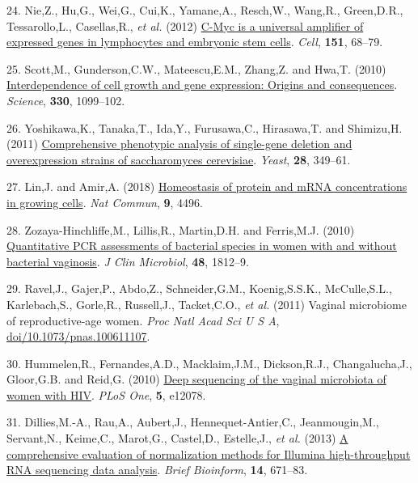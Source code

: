 \documentclass[
]{article}
\newlength{\cslhangindent}
\newenvironment{CSLReferences}[2] %
 {\begin{list}{}{%
  \setlength{\itemindent}{0pt}
  \setlength{\leftmargin}{0pt}
  \setlength{\parsep}{0pt}
  \ifodd #1
   \setlength{\leftmargin}{\cslhangindent}
   \setlength{\itemindent}{-1\cslhangindent}
  \fi
  \setlength{\itemsep}{#2\baselineskip}}}
 {\end{list}}
\begin{document}
\begin{CSLReferences}{1}{1}
24. Nie,Z., Hu,G., Wei,G., Cui,K., Yamane,A., Resch,W., Wang,R.,
Green,D.R., Tessarollo,L., Casellas,R., \emph{et al.} (2012)
\href{https://doi.org/10.1016/j.cell.2012.08.033}{C-{M}yc is a universal
amplifier of expressed genes in lymphocytes and embryonic stem cells}.
\emph{Cell}, \textbf{151}, 68--79.

25. Scott,M., Gunderson,C.W., Mateescu,E.M., Zhang,Z. and Hwa,T. (2010)
\href{https://doi.org/10.1126/science.1192588}{Interdependence of cell
growth and gene expression: Origins and consequences}. \emph{Science},
\textbf{330}, 1099--102.

26. Yoshikawa,K., Tanaka,T., Ida,Y., Furusawa,C., Hirasawa,T. and
Shimizu,H. (2011) \href{https://doi.org/10.1002/yea.1843}{Comprehensive
phenotypic analysis of single-gene deletion and overexpression strains
of saccharomyces cerevisiae}. \emph{Yeast}, \textbf{28}, 349--61.

27. Lin,J. and Amir,A. (2018)
\href{https://doi.org/10.1038/s41467-018-06714-z}{Homeostasis of protein
and mRNA concentrations in growing cells}. \emph{Nat Commun},
\textbf{9}, 4496.

28. Zozaya-Hinchliffe,M., Lillis,R., Martin,D.H. and Ferris,M.J. (2010)
\href{https://doi.org/10.1128/JCM.00851-09}{Quantitative PCR assessments
of bacterial species in women with and without bacterial vaginosis}.
\emph{J Clin Microbiol}, \textbf{48}, 1812--9.

29. Ravel,J., Gajer,P., Abdo,Z., Schneider,G.M., Koenig,S.S.K.,
McCulle,S.L., Karlebach,S., Gorle,R., Russell,J., Tacket,C.O., \emph{et
al.} (2011) Vaginal microbiome of reproductive-age women. \emph{Proc
Natl Acad Sci U S A},
\href{https://doi.org/doi/10.1073/pnas.100611107}{doi/10.1073/pnas.100611107}.

30. Hummelen,R., Fernandes,A.D., Macklaim,J.M., Dickson,R.J.,
Changalucha,J., Gloor,G.B. and Reid,G. (2010)
\href{https://doi.org/10.1371/journal.pone.0012078}{Deep sequencing of
the vaginal microbiota of women with {HIV}}. \emph{PLoS One},
\textbf{5}, e12078.

31. Dillies,M.-A., Rau,A., Aubert,J., Hennequet-Antier,C.,
Jeanmougin,M., Servant,N., Keime,C., Marot,G., Castel,D., Estelle,J.,
\emph{et al.} (2013) \href{https://doi.org/10.1093/bib/bbs046}{A
comprehensive evaluation of normalization methods for {Illumina}
high-throughput {RNA} sequencing data analysis}. \emph{Brief Bioinform},
\textbf{14}, 671--83.


\end{CSLReferences}
\end{document}
